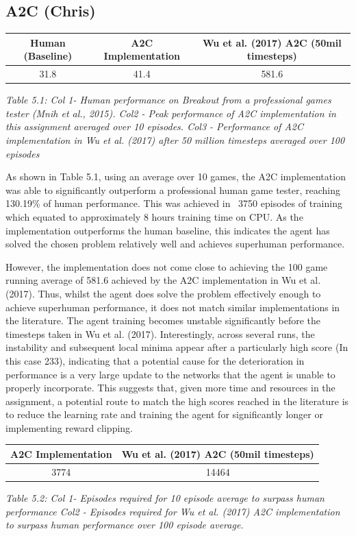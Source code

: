\documentclass{article}
\begin{document}
\subsection{A2C (Chris)}

\begin{table}[h!]
\centering
\begin{tabular}{|c | c | c |} 
 \hline
 Human (Baseline) & A2C Implementation & Wu et al. (2017) A2C (50mil timesteps) \\ [0.5ex] 
 \hline
 31.8 & 41.4 & 581.6  \\ 
 \hline
\end{tabular}
\end{table}
\emph{Table 5.1: Col 1- Human performance on Breakout from a professional games tester (Mnih et al., 2015). Col2 - Peak performance of A2C implementation in this assignment averaged over 10 episodes. Col3 - Performance of A2C implementation in Wu et al. (2017)  after 50 million timesteps averaged over 100 episodes}

As shown in Table 5.1, using an average over 10 games, the A2C implementation was able to significantly outperform a professional human game tester, reaching 130.19\% of human performance. This was achieved in ~3750 episodes of training which equated to approximately 8 hours training time on CPU. As the implementation outperforms the human baseline, this indicates the agent has solved the chosen problem relatively well and achieves superhuman performance.

However, the implementation does not come close to achieving the 100 game running average of 581.6 achieved by the A2C implementation in Wu et al. (2017). Thus, whilst the agent does solve the problem effectively enough to achieve superhuman performance, it does not match similar implementations in the literature. The agent training becomes unstable significantly before the timesteps taken in Wu et al. (2017). Interestingly, across several runs, the instability and subsequent local minima appear after a particularly high score (In this case 233), indicating that a potential cause for the deterioration in performance is a very large update to the networks that the agent is unable to properly incorporate. This suggests that, given more time and resources in the assignment, a potential route to match the high scores reached in the literature is to reduce the learning rate and training the agent for significantly longer or implementing reward clipping.

\begin{table}[h!]
\centering
\begin{tabular}{|c | c|} 
 \hline
 A2C Implementation & Wu et al. (2017) A2C (50mil timesteps) \\ [0.5ex] 
 \hline
 3774 & 14464   \\ 
 \hline
\end{tabular}
\end{table}
\emph{Table 5.2: Col 1- Episodes required for 10 episode average to surpass human performance Col2 - Episodes required for Wu et al. (2017) A2C implementation to surpass human performance over 100 episode average.}
\end{document}
